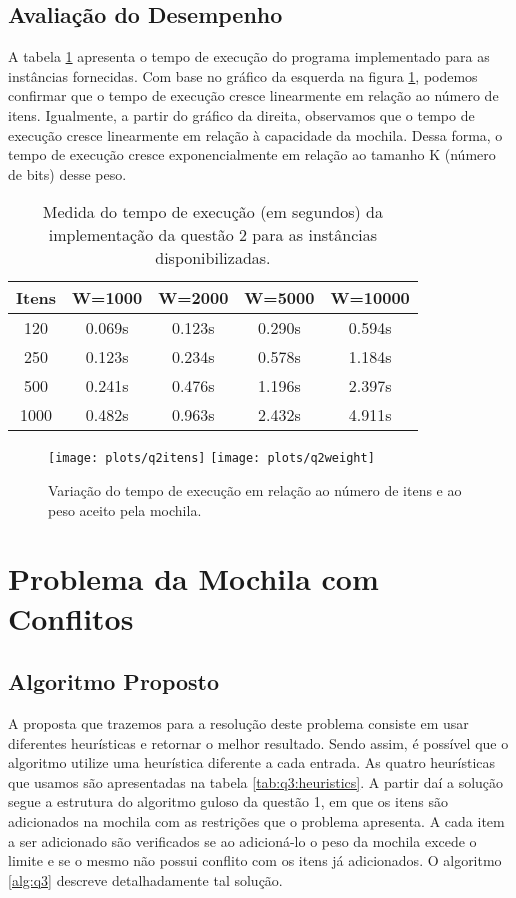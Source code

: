 \documentclass[a4paper, 11pt]{article}
\begin{document}
\subsection{Avaliação do Desempenho}

A tabela \ref{tab:q2:bench} apresenta o tempo de execução do programa implementado para as instâncias fornecidas.
Com base no gráfico da esquerda na figura \ref{fig:q2:itens}, podemos confirmar que o tempo de execução cresce linearmente em relação ao número de itens. Igualmente, a partir do gráfico da direita, observamos que o tempo de execução cresce linearmente em relação à capacidade da mochila. Dessa forma, o tempo de execução cresce exponencialmente em relação ao tamanho K (número de bits) desse peso.

\begin{table}[htb]
\centering
\begin{tabular}{c|c|c|c|c}
Itens & W=1000 & W=2000 & W=5000 & W=10000 \\
\hline
120 & 0.069s& 0.123s& 0.290s& 0.594s \\
250 & 0.123s& 0.234s& 0.578s& 1.184s \\
500 & 0.241s& 0.476s& 1.196s& 2.397s \\
1000 & 0.482s& 0.963s& 2.432s& 4.911s \\
\end{tabular}
\caption{Medida do tempo de execução (em segundos) da implementação da questão 2 para as instâncias disponibilizadas.}
\label{tab:q2:bench}
\end{table}

\begin{figure}[htb]
\centering
\texttt{[image: plots/q2itens]}
\texttt{[image: plots/q2weight]}
\caption{Variação do tempo de execução em relação ao número de itens e ao peso aceito pela mochila.}
\label{fig:q2:itens}
\end{figure}

\section{Problema da Mochila com Conflitos}

\subsection{Algoritmo Proposto}

A proposta que trazemos para a resolução deste problema consiste em usar diferentes heurísticas e retornar o melhor resultado. Sendo assim, é possível que o algoritmo utilize uma heurística diferente a cada entrada. As quatro heurísticas que usamos são apresentadas na tabela \ref{tab:q3:heuristics}. A partir daí a solução segue a estrutura do algoritmo guloso da questão 1, em que os itens são adicionados na mochila com as restrições que o problema apresenta. A cada item a ser adicionado são verificados se ao adicioná-lo o peso da mochila excede o limite e se o mesmo não possui conflito com os itens já adicionados. O algoritmo \ref{alg:q3} descreve detalhadamente tal solução.
\end{document}
